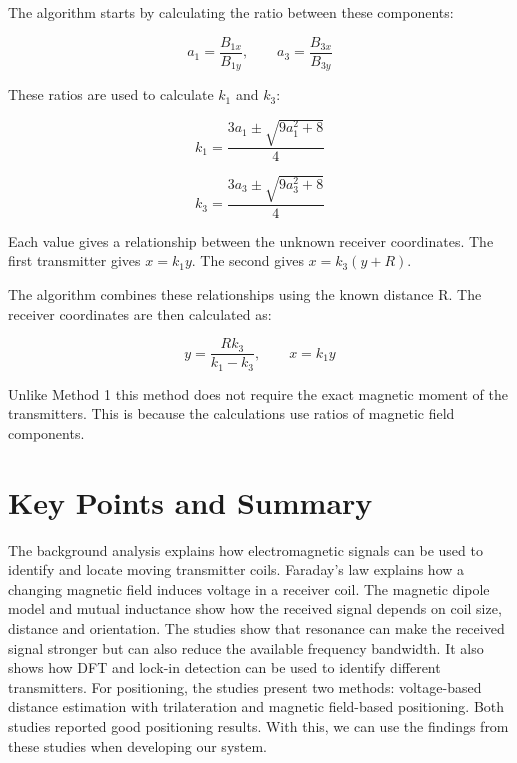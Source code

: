 The algorithm starts by calculating the ratio between these components:

\[
a_1=\frac{B_{1x}}{B_{1y}},\qquad
a_3=\frac{B_{3x}}{B_{3y}}
\]

These ratios are used to calculate \(k_1\) and \(k_3\):

\[
k_1=\frac{3a_1\pm\sqrt{9a_1^2+8}}{4}
\]

\[
k_3=\frac{3a_3\pm\sqrt{9a_3^2+8}}{4}
\]

Each value gives a relationship between the unknown receiver coordinates. The first transmitter gives \(x=k_1y\). The second gives \(x=k_3(y+R)\).

The algorithm combines these relationships using the known distance R. The receiver coordinates are then calculated as:

\[
y=\frac{Rk_3}{k_1-k_3},\qquad x=k_1y
\]

Unlike Method 1 this method does not require the exact magnetic moment of the transmitters. This is because the calculations use ratios of magnetic 
field components.




\section{Key Points and Summary} \label{sec:bg-1-6}
The background analysis explains how electromagnetic signals can be used to identify and locate moving transmitter coils. 
Faraday's law explains how a changing magnetic field induces voltage in a receiver coil. The magnetic dipole model and mutual inductance 
show how the received signal depends on coil size, distance and orientation.
The studies show that resonance can make the received signal stronger but can also reduce the available frequency bandwidth. 
It also shows how DFT and lock-in detection can be used to identify different transmitters. For positioning, the studies present 
two methods: voltage-based distance estimation with trilateration and magnetic field-based positioning. Both studies reported good 
positioning results. With this, we can use the findings from these studies when developing our system.




